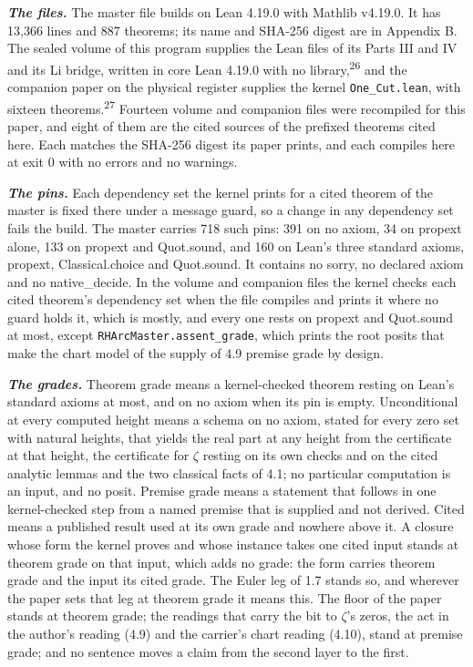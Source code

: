 \documentclass[10pt]{article}
\begin{document}
\textbf{\emph{The files.}} The master file builds on Lean 4.19.0 with
Mathlib v4.19.0. It has 13,366 lines and 887 theorems; its name and
SHA-256 digest are in Appendix B. The sealed volume of this program
supplies the Lean files of its Parts III and IV and its Li bridge,
written in core Lean 4.19.0 with no library,\textsuperscript{26} and the
companion paper on the physical register supplies the kernel
\texttt{One\_\allowbreak{}Cut.\allowbreak{}lean}, with sixteen
theorems.\textsuperscript{27} Fourteen volume and companion files were
recompiled for this paper, and eight of them are the cited sources of
the prefixed theorems cited here. Each matches the SHA-256 digest its
paper prints, and each compiles here at exit 0 with no errors and no
warnings.

\textbf{\emph{The pins.}} Each dependency set the kernel prints for a
cited theorem of the master is fixed there under a message guard, so a
change in any dependency set fails the build. The master carries 718
such pins: 391 on no axiom, 34 on propext alone, 133 on propext and
Quot.sound, and 160 on Lean's three standard axioms, propext,
Classical.choice and Quot.sound. It contains no sorry, no declared axiom
and no native\_decide. In the volume and companion files the kernel
checks each cited theorem's dependency set when the file compiles and
prints it where no guard holds it, which is mostly, and every one rests
on propext and Quot.sound at most, except
\texttt{RHArcMaster.\allowbreak{}assent\_\allowbreak{}grade}, which
prints the root posits that make the chart model of the supply of 4.9
premise grade by design.

\textbf{\emph{The grades.}} Theorem grade means a kernel-checked theorem
resting on Lean's standard axioms at most, and on no axiom when its pin
is empty. Unconditional at every computed height means a schema on no
axiom, stated for every zero set with natural heights, that yields the
real part at any height from the certificate at that height, the
certificate for \(\zeta\) resting on its own checks and on the cited
analytic lemmas and the two classical facts of 4.1; no particular
computation is an input, and no posit. Premise grade means a statement
that follows in one kernel-checked step from a named premise that is
supplied and not derived. Cited means a published result used at its own
grade and nowhere above it. A closure whose form the kernel proves and
whose instance takes one cited input stands at theorem grade on that
input, which adds no grade: the form carries theorem grade and the input
its cited grade. The Euler leg of 1.7 stands so, and wherever the paper
sets that leg at theorem grade it means this. The floor of the paper
stands at theorem grade; the readings that carry the bit to \(\zeta\)'s
zeros, the act in the author's reading (4.9) and the carrier's chart
reading (4.10), stand at premise grade; and no sentence moves a claim
from the second layer to the first.
\end{document}
